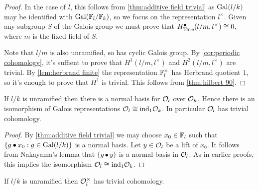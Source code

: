 \begin{proof}
	In the case of $l$, this follows from \ref{thm:additive field trivial} as $\mathrm{Gal}(l/k)$ may be
	identified with $\mathrm{Gal}({\mathbb F}_l / {\mathbb F}_k)$, so we focus on the
	representation $l^\times$. Given any subgroup $S$ of the Galois group we must prove that
	$H^\bullet_{\mathrm{Tate}}(l/m,l^\times) \cong 0$, where $m$ is the fixed field of $S$.

	Note that $l/m$ is also unramified, so has cyclic Galois group.
	By \ref{cor:periodic cohomology},
	it's suffient to prove that $H^1(l/m,l^\times)$ and $H^2(l/m,l^\times)$ are trivial.
	By \ref{lem:herbrand finite} the representation ${\mathbb F}_l^\times$ has Herbrand quotient $1$,
	so it's enough to prove that $H^1$ is trivial.
	This follows from \ref{thm:hilbert 90}.
\end{proof}


\begin{lemma} \label{lem:unramified additive trivial}
	If $l/k$ is unramified then there is a normal basis for ${\mathcal O}_l$ over ${\mathcal O}_k$.
	Hence there is an isomorphism of Galois representations ${\mathcal O}_l \cong \mathrm{ind}_1 {\mathcal O}_k$.
	In particular ${\mathcal O}_l$ has trivial cohomology.
\end{lemma}

\begin{proof}
	By \ref{thm:additive field trivial}
	we may choose $x_0 \in {\mathbb F}_l$
	such that $\{g \bullet x_0 :g \in \mathrm{Gal}(l/k)\}$ is a normal basis.
	Let $y \in {\mathcal O}_l$ be a lift of $x_0$.
	It follows from Nakayama's lemma that $\{g \bullet y\}$ is a normal basis	in ${\mathcal O}_l$.
	As in earlier proofs, this implies the isomorphism ${\mathcal O}_l \cong \mathrm{ind}_1 {\mathcal O}_k$.
\end{proof}




\begin{lemma}	\label{lem:unramified units trivial}
	If $l/k$ is unramified then ${\mathcal O}_l^\times$ has trivial cohomology.
\end{lemma}

